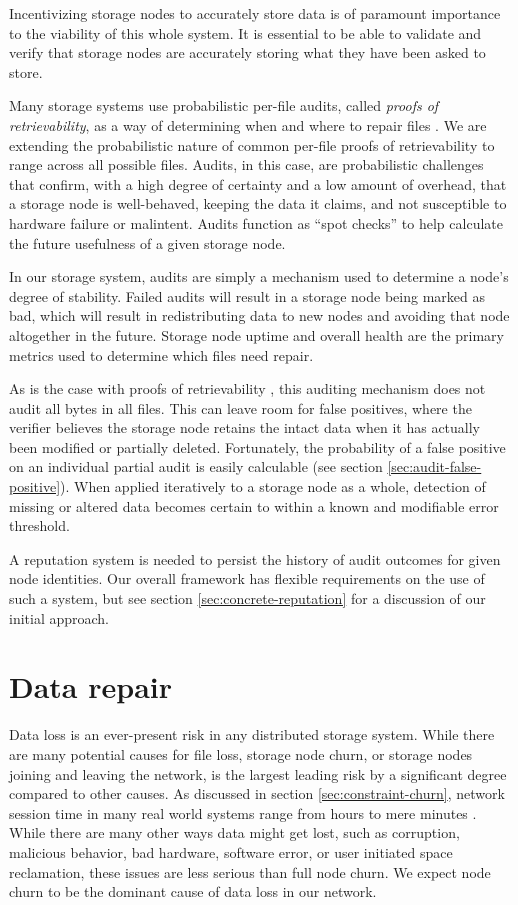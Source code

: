 \documentclass[8pt,fleqn,openany]{book}
\begin{document}
Incentivizing storage nodes to accurately store data is of paramount importance
to
the viability of this whole system. It is essential to be able to
validate and verify that storage nodes are accurately storing what they have
been
asked to store.

Many storage systems use probabilistic per-file audits, called
{\em proofs of retrievability}, as a way of determining
when and where to repair files \cite{juels, shacham}.
We are extending the probabilistic nature of common per-file
proofs of retrievability to range across all possible files.
Audits, in this case, are probabilistic challenges that confirm, with a high
degree of certainty and a low amount of overhead, that a storage node is
well-behaved, keeping the data it claims, and not susceptible to hardware
failure or malintent. Audits function as ``spot checks'' \cite{juels2} to help
calculate the future usefulness of a given storage node.

In our storage system,
audits are simply a mechanism used to determine a node's degree of stability.
Failed audits will result in a storage node being marked as bad, which
will result in redistributing data to new nodes and avoiding that node altogether
in the future. Storage node uptime and overall health are the primary metrics
used to determine which files need repair.

As is the case with proofs of retrievability \cite{juels, shacham},
this auditing mechanism does not audit all bytes in all files. This can
leave room for false positives, where the verifier believes the storage node
retains the intact data when it has actually been modified or partially
deleted. Fortunately, the probability of a false positive on an individual
partial audit is easily calculable (see section
\ref{sec:audit-false-positive}). When applied
iteratively to a storage node as a whole, detection of missing or altered data
becomes certain to within a known and modifiable error threshold.

A reputation system is needed to persist the history of audit outcomes for
given node identities. Our overall framework has flexible requirements on the use
of such a system, but see section \ref{sec:concrete-reputation} for a
discussion of our initial approach.

\section{Data repair}

Data loss is an ever-present risk in any distributed storage system. While there
are many potential causes for file loss, storage node churn, or storage
nodes joining and leaving the network, is the largest leading risk by a
significant degree compared to other causes.
As discussed in section \ref{sec:constraint-churn}, network session time in
many real world systems range from hours to mere minutes \cite{dht-churn}.
While there are many other ways data might get lost, such as corruption,
malicious behavior, bad hardware, software error, or user initiated space
reclamation, these issues are less serious than full node churn. We expect
node churn to be the dominant cause of data loss in our network.
\end{document}
